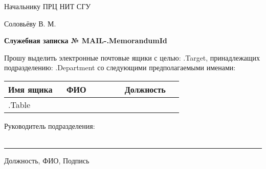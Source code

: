 \documentclass[12pt]{article}
\begin{document}
    \begin{flushright}
        Начальнику ПРЦ НИТ СГУ

        Соловьёву В. М. \\[50pt]
    \end{flushright}

    \begin{center}
        \large
        \textbf{Служебная записка № MAIL-{{.MemorandumId}} } \\[20pt]
    \end{center}
    \begin{flushleft}
        \large
        Прошу выделить электронные почтовые ящики с целью: {{.Target}}, принадлежащих подразделению: {{.Department}} со следующими предполагаемыми именами:
    \end{flushleft}




    \begin{table}[!h]
        \large
        \centering
        \label{my-label}
        \begin{tabular}{|p{0.30\linewidth}|p{0.30\linewidth}|p{0.30\linewidth}|}
            \hline
            Имя ящика & ФИО & Должность \\
            \hline
            {{.Table}}
        \end{tabular}
    \end{table}



    \normalsize
    \begin{flushleft}
        \large
        Руководитель подразделения:\\~\\
    \end{flushleft}
    \centering
    \noindent\rule{550pt}{0.4pt}
    \large
    Должность, ФИО, Подпись\\[50pt]
\end{document}
